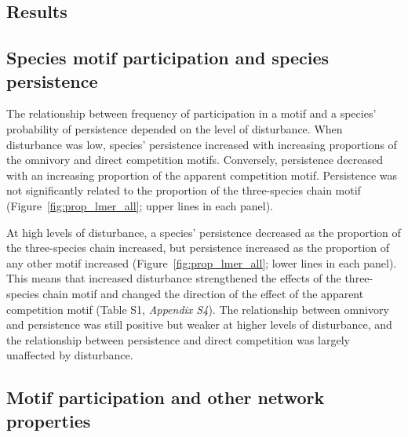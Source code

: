 \documentclass[12pt]{article}
\begin{document}
\begin{spacing}{2.0}
\section*{Results}


    \subsection*{Species motif participation and species persistence} 
    
       The relationship between frequency of participation in a motif and a species' probability of persistence depended on the level of disturbance. 
       When disturbance was low, species' persistence increased with increasing proportions of the omnivory and direct competition motifs. 
       Conversely, persistence decreased with an increasing proportion of the apparent competition motif. 
       Persistence was not significantly related to the proportion of the three-species chain motif (Figure~\ref{fig:prop_lmer_all}; upper lines in each panel).
            
            
        At high levels of disturbance, a species' persistence decreased as the proportion of the three-species chain increased, but persistence increased as the proportion of any other motif increased (Figure~\ref{fig:prop_lmer_all}; lower lines in each panel). 
        This means that increased disturbance strengthened the effects of the three-species chain motif and changed the direction of the effect of the apparent competition motif  (Table S1, \emph{Appendix S4}).
        The relationship between omnivory and persistence was still positive but weaker at higher levels of disturbance, and the relationship between persistence and direct competition was largely unaffected by disturbance.

    \subsection*{Motif participation and other network properties}


\end{spacing}
\end{document}
